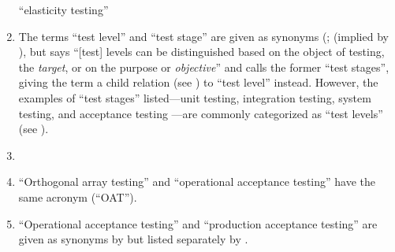 \begin{enumerate}
          ``elasticity testing'' \swebokElasRef{}
    \item %
          The terms ``test level'' and ``test stage'' are given as synonyms
          \ifnotpaper (\citealpISTQB{}; \else \cite{ISTQB} (\fi implied
          by \citealp[p.~9]{Gerrard2000a}), but
          \citet[p.~5\=/6]{SWEBOK2024} says ``[test] levels can be distinguished
          based on the object of testing, the \emph{target}, or on the purpose
          or \emph{objective}'' and calls the former ``test stages'', giving
          the term a child relation (see ) to ``test level''
          instead. However, the examples of ``test stages'' listed---unit
          testing, integration testing, system testing, and acceptance testing
          \citep[pp.~5\=/6 to 5\=/7]{SWEBOK2024}---are commonly categorized as
          ``test levels'' (see ).
    \item %
          \tolTestFlaw{}
    \item %
          ``Orthogonal array testing'' \ifnotpaper \citetext{%
                  \citealp[pp.~5\=/1, 5\=/11]{SWEBOK2024};
                  implied by \citealp[pp.~467, 473]{Valcheva2013};
                  \citealp[pp.~1573\==1577, 1580]{YuEtAl2011}} \else
              \cite[pp.~5\=/1, 5\=/11]{SWEBOK2024} \fi and ``operational
          acceptance testing'' \citep[p.~30]{Firesmith2015} have the same
          acronym (``OAT'').
    \item %
          ``Operational acceptance testing'' and ``production acceptance
          testing'' are given as synonyms by \citetISTQB{} but listed
          separately by \citet[p.~30]{Firesmith2015}.


\end{enumerate}
